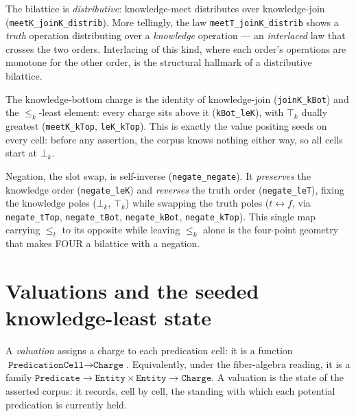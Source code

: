 \begin{theorem}\label{thm:bilattice-distrib}\leanok{}
  The bilattice is \emph{distributive}: knowledge-meet distributes over knowledge-join (\texttt{meetK\_joinK\_distrib}). More tellingly, the law \texttt{meetT\_joinK\_distrib} shows a \emph{truth} operation distributing over a \emph{knowledge} operation --- an \emph{interlaced} law that crosses the two orders. Interlacing of this kind, where each order's operations are monotone for the other order, is the structural hallmark of a distributive bilattice.
\end{theorem}

\begin{theorem}\label{thm:kBot-least}\leanok{}
  The knowledge-bottom charge is the identity of knowledge-join (\texttt{joinK\_kBot}) and the $\le_k$-least element: every charge sits above it (\texttt{kBot\_leK}), with $\top_k$ dually greatest (\texttt{meetK\_kTop}, \texttt{leK\_kTop}). This is exactly the value positing seeds on every cell: before any assertion, the corpus knows nothing either way, so all cells start at $\bot_k$.
\end{theorem}

\begin{theorem}\label{thm:negate-duality}\leanok{}
  Negation, the slot swap, is self-inverse (\texttt{negate\_negate}). It \emph{preserves} the knowledge order (\texttt{negate\_leK}) and \emph{reverses} the truth order (\texttt{negate\_leT}), fixing the knowledge poles ($\bot_k$, $\top_k$) while swapping the truth poles ($t \leftrightarrow f$, via \texttt{negate\_tTop}, \texttt{negate\_tBot}, \texttt{negate\_kBot}, \texttt{negate\_kTop}). This single map carrying $\le_t$ to its opposite while leaving $\le_k$ alone is the four-point geometry that makes FOUR a bilattice with a negation.
\end{theorem}

\section{Valuations and the seeded knowledge-least state}

\begin{definition}[Valuation]\label{def:valuation}\leanok{}
  A \emph{valuation} assigns a charge to each predication cell: it is a function $\texttt{PredicationCell} \to \texttt{Charge}$. Equivalently, under the fiber-algebra reading, it is a family $\texttt{Predicate} \to \texttt{Entity} \times \texttt{Entity} \to \texttt{Charge}$. A valuation is the state of the asserted corpus: it records, cell by cell, the standing with which each potential predication is currently held.
\end{definition}


